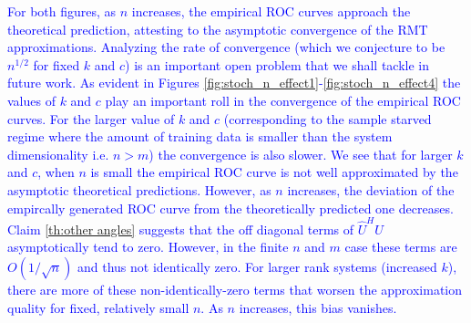 \textcolor{blue}{For both figures, as $n$ increases, the empirical ROC curves approach the theoretical prediction, attesting to the asymptotic convergence of the RMT approximations. Analyzing the rate of convergence (which we conjecture to be $n^{1/2}$ for fixed $k$ and $c$) is an important open problem that we shall tackle in future work. As evident in Figures \ref{fig:stoch_n_effect1}-\ref{fig:stoch_n_effect4} the values of $k$ and $c$ play an important roll in the convergence of the empirical ROC curves. For the larger value of $k$ and $c$ (corresponding to the sample starved regime where the amount of training data is smaller than the system dimensionality i.e. $n>m$) the convergence is also slower. We see that for larger $k$ and $c$, when $n$ is small the empirical ROC curve is not well approximated by the asymptotic theoretical predictions. However, as $n$ increases, the deviation of the empircally generated ROC curve from the theoretically predicted one decreases. Claim \ref{th:other angles} suggests that the off diagonal terms of $\widehat{U}^HU$ asymptotically tend to zero. However, in the finite $n$ and $m$ case these terms are $O(1/\sqrt{n})$ and thus not identically zero. For larger rank systems (increased $k$), there are more of these non-identically-zero terms that worsen the approximation quality for fixed, relatively small $n$. As $n$ increases, this bias vanishes.}

